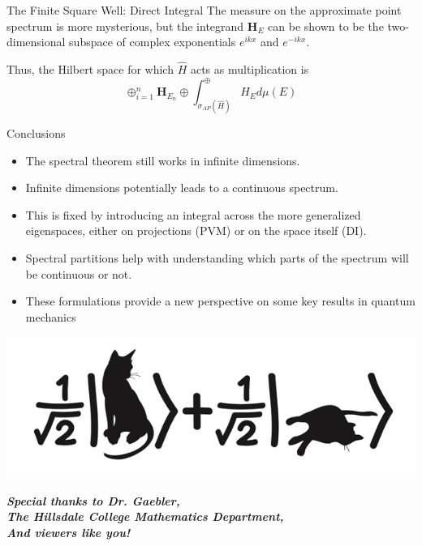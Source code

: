\documentclass{beamer}
\begin{document}
\begin{frame}{The Finite Square Well: Direct Integral}
    The measure on the approximate point spectrum is more mysterious, but the
    integrand $\textbf{H}_E$ can be shown to be the two-dimensional subspace of
    complex exponentials $e^{ikx}$ and $e^{-ikx}$.

    Thus, the Hilbert space for which $\hat{H}$ acts as multiplication is
    \[
        \oplus_{i=1}^n \textbf{H}_{E_n} \oplus
        \int_{\sigma_{AP}(\hat{H})}^{\oplus} H_Ed\mu(E)
    \]
\end{frame}

\begin{frame}{Conclusions}
    \begin{itemize}
        \item The spectral theorem still works in infinite dimensions.
        \item Infinite dimensions potentially leads to a continuous spectrum.
        \item This is fixed by introducing an integral across the more
            generalized eigenspaces, either on projections (PVM) or on the space
            itself (DI).
        \item Spectral partitions help with understanding which parts of the
            spectrum will be continuous or not.
        \item These formulations provide a new perspective on some key results
            in quantum mechanics
    \end{itemize}

\end{frame}

\begin{frame}
\begin{center}
\includegraphics[scale=0.5]{dead_alive_cat}
\end{center}
\begin{center}
\emph{\textbf{  Special thanks to Dr. Gaebler,\\
                The Hillsdale College Mathematics Department,\\
                And viewers like you!}}
\end{center}
\end{frame}
\end{document}
